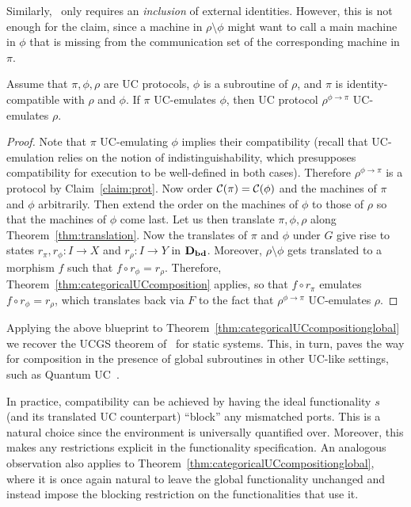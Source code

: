 Similarly,~\cite[Section~2]{Can20} only requires an \emph{inclusion} of external identities. However, this is not enough for the claim, since a machine in $\rho\setminus\phi$ might want to call a main machine in $\phi$ that is missing from the communication set of the corresponding machine in $\pi$. 
\begin{corollary}\label{cor:UCcomposition}
    Assume that $\pi,\phi,\rho$ are UC protocols, $\phi$ is a subroutine of $\rho$,  and $\pi$ is identity-compatible with $\rho$ and $\phi$. If $\pi$ UC-emulates $\phi$, then UC protocol $\rho^{\phi\to\pi}$ UC-emulates $\rho$.
\end{corollary}
\begin{proof}
    Note that $\pi$ UC-emulating $\phi$ implies their compatibility (recall that UC-emulation relies on the notion of indistinguishability, which presupposes compatibility for execution to be well-defined in both cases). Therefore $\rho^{\phi\to\pi}$ is a protocol by Claim~\ref{claim:prot}. Now order $\mathcal{C}(\pi)=\mathcal{C}(\phi)$ and the machines of $\pi$ and $\phi$ arbitrarily. Then extend the order on the machines of $\phi$ to those of $\rho$ so that the machines of $\phi$ come last. Let us then translate $\pi,\phi,\rho$ along Theorem~\ref{thm:translation}. Now the translates of $\pi$ and $\phi$ under $G$ give rise to states $r_\pi,r_\phi \colon I\to X$ and $r_\rho\colon I\to Y$ in $\mathbf{D_{bd}}$. Moreover, $\rho \setminus \phi$ gets translated to a morphism $f$ such that $f\circ r_\phi=r_\rho$. Therefore, Theorem~\ref{thm:categoricalUCcomposition} applies, so that $f\circ r_\pi$ emulates $f\circ r_\phi=r_\rho$, which translates back via $F$ to the fact that $\rho^{\phi\to\pi}$ UC-emulates $\rho$. 
\end{proof}

Applying the above blueprint to Theorem~\ref{thm:categoricalUCcompositionglobal} we recover the UCGS theorem of~\cite{BCH+:globalwithUC} for static systems. This, in turn, paves the way for composition in the presence of global subroutines in other UC-like settings, such as Quantum UC~\cite{Unr10}. 

In practice, compatibility can be achieved by having the ideal functionality $s$ (and its translated UC counterpart) ``block'' any mismatched ports. This is a natural choice since the environment is universally quantified over. Moreover, this makes any restrictions explicit in the functionality specification. An analogous observation also applies to Theorem~\ref{thm:categoricalUCcompositionglobal}, where it is once again natural to leave the global functionality unchanged and instead impose the blocking restriction on the functionalities that use it.





